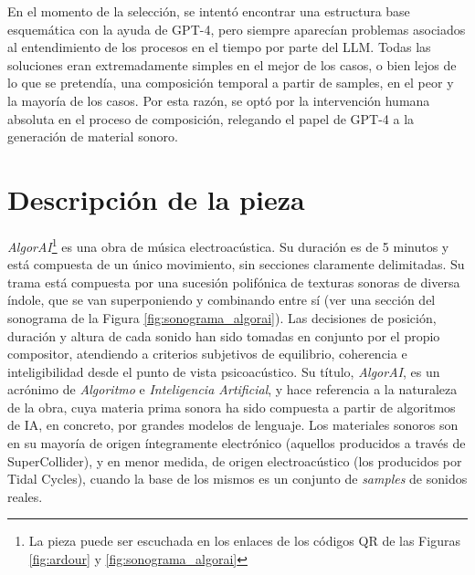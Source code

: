 En el momento de la selección, se intentó encontrar una estructura base esquemática con la ayuda de GPT-4, pero siempre aparecían problemas asociados al entendimiento de los procesos en el tiempo por parte del LLM. Todas las soluciones eran extremadamente simples en el mejor de los casos, o bien lejos de lo que se pretendía, una composición temporal a partir de samples, en el peor y la mayoría de los casos. Por esta razón, se optó por la intervención humana absoluta en el proceso de composición, relegando el papel de GPT-4 a la generación de material sonoro.

\section{Descripción de la pieza}

\textit{AlgorAI}\footnote{La pieza puede ser escuchada en los enlaces de los códigos QR de las Figuras \ref{fig:ardour} y \ref{fig:sonograma_algorai}} es una obra de música electroacústica. Su duración es de 5 minutos y está compuesta de un único movimiento, sin secciones claramente delimitadas. Su trama está compuesta por una sucesión polifónica de texturas sonoras de diversa índole, que se van superponiendo y combinando entre sí (ver una sección del sonograma de la Figura \ref{fig:sonograma_algorai}). Las decisiones de posición, duración y altura de cada sonido han sido tomadas en conjunto por el propio compositor, atendiendo a criterios subjetivos de equilibrio, coherencia e inteligibilidad desde el punto de vista psicoacústico. Su título, \textit{AlgorAI}, es un acrónimo de \textit{Algoritmo} e \textit{Inteligencia Artificial}, y hace referencia a la naturaleza de la obra, cuya materia prima sonora ha sido compuesta a partir de algoritmos de IA, en concreto, por grandes modelos de lenguaje. Los materiales sonoros son en su mayoría de origen íntegramente electrónico (aquellos producidos a través de SuperCollider), y en menor medida, de origen electroacústico (los producidos por Tidal Cycles), cuando la base de los mismos es un conjunto de \textit{samples} de sonidos reales.

